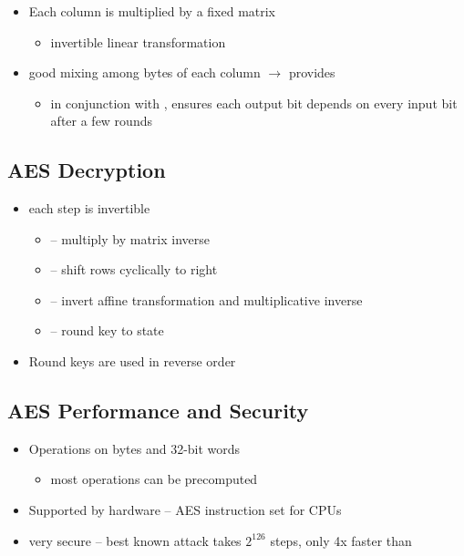 \documentclass[final]{article}
\begin{document}
\subsubsection*{}
\begin{itemize}[nosep]
    \item Each column is multiplied by a fixed matrix
          \begin{itemize}[nosep]
              \item invertible linear transformation
          \end{itemize}
    \item good mixing among bytes of each column $\rightarrow$ provides 
          \begin{itemize}[nosep]
              \item in conjunction with , ensures each output bit depends on every input bit after a few rounds
          \end{itemize}
\end{itemize}
\subsection{AES Decryption}
\begin{itemize}[nosep]
    \item each step is invertible
          \begin{itemize}[nosep]
              \item {} -- multiply by matrix inverse
              \item {} -- shift rows cyclically to right
              \item {} -- invert affine transformation and multiplicative inverse
              \item {} --  round key to state
          \end{itemize}
    \item Round keys are used in reverse order
\end{itemize}
\subsection{AES Performance and Security}
\begin{itemize}[nosep]
    \item Operations on bytes and 32-bit words
          \begin{itemize}[nosep]\item most operations can be precomputed\end{itemize}
    \item Supported by hardware -- AES instruction set for CPUs
    \item very secure -- best known attack takes $2^{126}$ steps, only 4x faster than 
\end{itemize}
\end{document}
